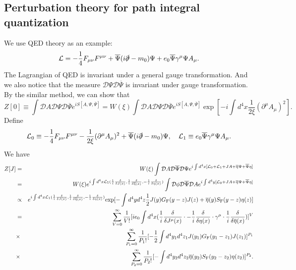 \subsection{Perturbation theory for path integral quantization}
\noindent
We use QED theory as an example:
\[\mathcal{L} = -\frac{1}{4}F_{\mu\nu}F^{\mu\nu} + \overline{\Psi} (i\slashed{\partial}-m_0) \Psi + e_0\overline{\Psi}\gamma^{\mu}\Psi A_{\mu}.\]
The Lagrangian of QED is invariant under a general gauge transformation. 
And we also notice that the measure $\mathcal{D}\Psi \mathcal{D}\overline{\Psi}$ is invariant under gauge transformation.
By the similar method, we can show that
\[Z[0] \equiv \int \mathcal{D}A \mathcal{D}\Psi \mathcal{D}\overline{\Psi}e^{iS[A,\Psi,\overline{\Psi}]} = W(\xi)\int \mathcal{D}A \mathcal{D}\Psi \mathcal{D}\overline{\Psi}e^{iS[A,\Psi,\overline{\Psi}]} \exp\left[ -i \int d^4x \frac{1}{2\xi} (\partial^{\mu}A_{\mu})^2\right] .\]
Define
\[\mathcal{L}_0 \equiv -\frac{1}{4}F_{\mu\nu}F^{\mu\nu} - \frac{1}{2\xi} (\partial^{\mu}A_{\mu})^2 + \overline{\Psi} (i\slashed{\partial}-m_0) \Psi , \quad \mathcal{L}_1 \equiv e_0\overline{\Psi}\gamma^{\mu}\Psi A_{\mu}.\]
We have
\begin{eqnarray}
Z[J] &=& W(\xi) \int \mathcal{D}A \mathcal{D}\overline{\Psi} \mathcal{D}\Psi e^{i\int d^4x [\mathcal{L}_0 + \mathcal{L}_1 + JA + \overline{\eta}\Psi + \overline{\Psi}\eta]} \nonumber \\
&=& W(\xi) e^{i\int d^4x \mathcal{L}_1(\frac{1}{i} \frac{\delta}{\delta J(x)},\frac{1}{i}\frac{\delta}{\delta \overline{\eta}(x)},-\frac{1}{i}\frac{\delta}{\delta \eta(x)})} \int \mathcal{D}\phi \mathcal{D}\overline{\Psi} \mathcal{D}A e^{i\int d^4y [\mathcal{L}_0 + JA + \overline{\eta}\Psi + \overline{\Psi}\eta]} \nonumber \\
&\propto & e^{i\int d^4x \mathcal{L}_1(\frac{1}{i} \frac{\delta}{\delta J(x)},\frac{1}{i}\frac{\delta}{\delta \overline{\eta}(x)},-\frac{1}{i}\frac{\delta}{\delta \eta(x)})} \mathrm{exp} [- \int d^4y d^4z  \frac{1}{2} J(y)G_{\rm F}(y-z)J(z) + \overline{\eta}(y)S_{\rm F}(y-z)\eta(z)] \nonumber \\
& =& \sum_{V=0}^{\infty} \frac{1}{V!} [ie_0 \int d^4x (\frac{1}{i} \frac{\delta}{\delta J^{\mu}(x)} \cdot -\frac{1}{i}\frac{\delta}{\delta \eta(x)} \cdot \gamma^{\mu} \cdot  \frac{1}{i}\frac{\delta}{\delta \overline{\eta}(x)})]^V \nonumber \\
&\times & \sum_{P_1=0}^{\infty} \frac{1}{P_1!} [-\frac{1}{2} \int d^4y_1 d^4z_1 J(y_1)G_{\rm F}(y_1-z_1)J(z_1)]^{P_1} \nonumber \\
&\times &  \sum_{P_2=0}^{\infty} \frac{1}{P_2!} [-\int d^4y_2 d^4z_2 \overline{\eta}(y_2)S_{\rm F}(y_2-z_2)\eta(z_2)]^{P_2} .\nonumber
\end{eqnarray}
